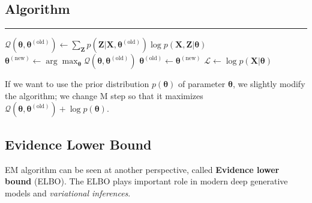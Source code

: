 \documentclass{article}
\begin{document}
    \subsection{Algorithm}
        \begin{algorithm}[H]
            \DontPrintSemicolon
            
            \caption{EM algorithm}


            \BlankLine
            \hrule

            {
                $\mathcal{Q}(\bm\theta,\bm\theta^{(\text{old})}) \leftarrow \sum_{\textbf{Z}}p(\textbf{Z}|\textbf{X},\bm\theta^{(\text{old})})\log{p(\textbf{X},\textbf{Z}|\bm\theta)}$\;
                $\bm\theta^{(\text{new})} \leftarrow \arg\max_{\bm\theta}{\mathcal{Q}(\bm\theta,\bm\theta^{(\text{old})})}$\;
                $\bm\theta^{(\text{old})} \leftarrow \bm\theta^{(\text{new})}$\;
                $\mathcal{L} \leftarrow \log{p(\textbf{X}|\bm\theta)}$\;
            }
        \end{algorithm}

        If we want to use the prior distribution $p(\bm\theta)$ of parameter $\bm\theta$, we slightly modify the algorithm;
        we change M step so that it maximizes $\mathcal{Q}(\bm\theta,\bm\theta^{(\text{old})}) + \log{p(\bm\theta)}$.

    \subsection{Evidence Lower Bound}
        EM algorithm can be seen at another perspective, called \textbf{Evidence lower bound} (ELBO). The ELBO plays important role in
        modern deep generative models and \emph{variational inferences}.
\end{document}
